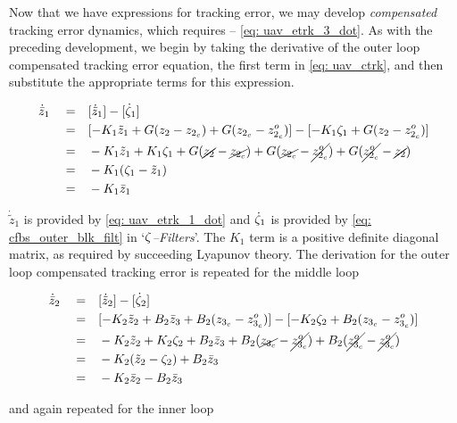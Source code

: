 \documentclass[12pt]{ucthesis}
\begin{document}
Now that we have expressions for tracking error, we may develop \textit{compensated} tracking error dynamics, which requires  -- \ref{eq: uav_etrk_3_dot}. As with the preceding development, we begin by taking the derivative of the outer loop compensated tracking error equation, the first term in \autoref{eq: uav_ctrk}, and then substitute the appropriate terms for this expression.
%
\begin{fleqn} 
\begin{align} \label{eq: uav_ctrk_1_dot}
\dot{\bar{z}}_1 \quad =& \quad [\dot{\tilde{z}}_1] - [\dot{\zeta}_1] \nonumber \\
				\quad =& \quad [-K_1 \tilde{z}_1 + G(z_2 - z_{2_c}) + G(z_{2_c}-z^o_{2_c})] - [-K_1 \zeta_1 + G(z_2 - z^o_{2_c})] \nonumber \\
				\quad =& \quad -K_1 \tilde{z}_1 + K_1 \zeta_1 + G(\cancel{z_2} - \cancel{z_{2_c}}) + G(\cancel{z_{2_c}} -\cancel{z^o_{2_c}}) + G(\cancel{z^o_{2_c}} -\cancel{z_2}) \nonumber \\
				\quad =& \quad -K_1 (\zeta_1 - \tilde{z}_1) \nonumber \\
				\quad =& \quad -K_1 \bar{z}_1
\end{align}
\end{fleqn}
$\dot{\tilde{z}}_1$ is provided by \autoref{eq: uav_etrk_1_dot} and $\dot{\zeta}_1$ is provided by \autoref{eq: cfbs_outer_blk_filt} in `\textit{$\zeta$--Filters}'. The $K_1$ term is a positive definite diagonal matrix, as required by succeeding Lyapunov theory. The derivation for the outer loop compensated tracking error is repeated for the middle loop
\begin{fleqn} 
\begin{align} \label{eq: uav_ctrk_2_dot}
\dot{\bar{z}}_2 \quad =& \quad [\dot{\tilde{z}}_2] - [\dot{\zeta}_2] \nonumber \\
				\quad =& \quad [-K_2 \tilde{z}_2 + B_2 \bar{z}_3 + B_2(z_{3_c}-z^o_{3_{c}})] - [-K_2 \zeta_2 + B_2(z_{3_c} - z^o_{3_c})] \nonumber \\
				\quad =& \quad -K_2 \tilde{z}_2 + K_2 \zeta_2 + B_2 \bar{z}_3 + B_2(\cancel{z_{3_c}} - \cancel{z^o_{3_c}}) + B_2(\cancel{z^o_{3_c}} -\cancel{z^o_{3_c}}) \nonumber \\
				\quad =& \quad -K_2 (\tilde{z}_2 - \zeta_2) + B_2 \bar{z}_3 \nonumber \\
				\quad =& \quad -K_2 \bar{z}_2 - B_2 \bar{z}_3
\end{align}
\end{fleqn}
and again repeated for the inner loop
\end{document}
